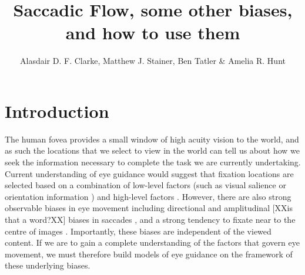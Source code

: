 \documentclass[a4paper, twocolumn, oneside, 10pt]{article}
\title{Saccadic Flow, some other biases, and how to use them}
\author{Alasdair D. F. Clarke, Matthew J. Stainer, Ben Tatler \& Amelia R. Hunt}
\begin{document}

\section{Introduction}

The human fovea provides a small window of high acuity vision to the world, and as such the locations that we select to view in the world can tell us about how we seek the information necessary to complete the task we are currently undertaking. Current understanding of eye guidance would suggest that fixation locations are selected based on a combination of low-level factors (such as visual salience \citep{itti-koch2000} or orientation information \citep{baddeley2006}) and high-level factors \citep{yarbus1967, buswell1935, land2001}. However, there are also strong observable biases in eye movement including directional and amplitudinal [XXis that a word?XX] biases in saccades \citep{tatler2008, tatler2009, foulsham2010}, and a strong tendency to fixate near to the centre of images \citep{tatler2007, canosa2003}. Importantly, these biases are independent of the viewed content. If we are to gain a complete understanding of the factors that govern eye movement, we must therefore build models of eye guidance on the framework of these underlying biases.
\end{document}
